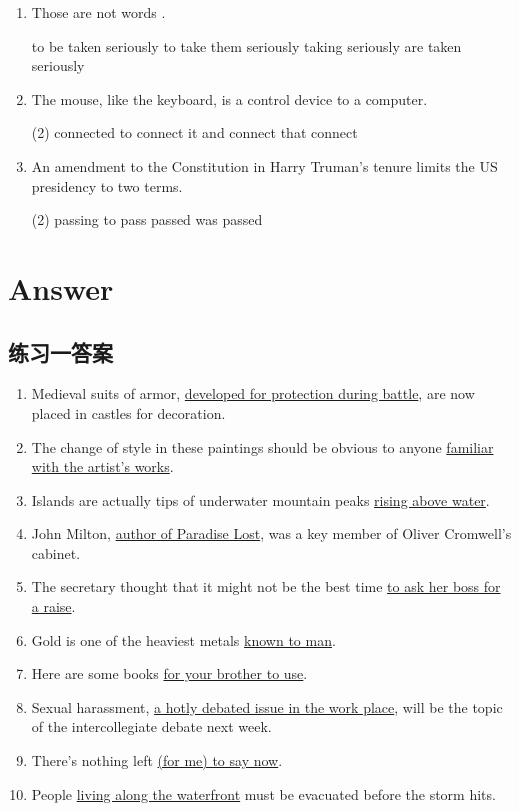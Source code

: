 \begin{enumerate}
\item Those are not words \ttu.
\begin{tasks}
  \task to be taken seriously
  \task to take them seriously
  \task taking seriously
  \task are taken seriously
\end{tasks}

\item The mouse, like the keyboard, is a control device \ttu to a computer.
\begin{tasks}(2)
  \task connected
  \task to connect it
  \task and connect
  \task that connect
\end{tasks}

\item An amendment to the Constitution \ttu in Harry Truman's tenure limits the US presidency to two terms.
\begin{tasks}(2)
  \task passing
  \task to pass
  \task passed
  \task was passed
\end{tasks}

\end{enumerate}

\section{Answer}
\subsection{练习一答案}
\begin{enumerate}
\item Medieval suits of armor, \ul{developed for protection during battle}, are now
  placed in castles for decoration.

\item The change of style in these paintings should be obvious to anyone
  \ul{familiar with the artist's works}.

\item Islands are actually tips of underwater mountain peaks \ul{rising above
    water}.

\item John Milton, \ul{author of Paradise Lost}, was a key member of Oliver
  Cromwell's cabinet.
\item The secretary thought that it might not be the best time \ul{to ask her
    boss for a raise}.
\item Gold is one of the heaviest metals \ul{known to man}.
\item Here are some books \ul{for your brother to use}.
\item Sexual harassment, \ul{a hotly debated issue in the work place}, will be the
  topic of the intercollegiate debate next week.
\item There's nothing left \ul{(for me) to say now}.
\item People \ul{living along the waterfront} must be evacuated before the storm
  hits.
\end{enumerate}

